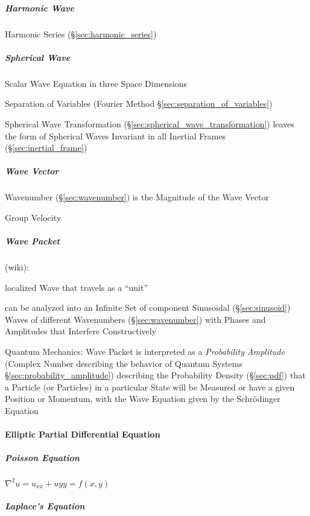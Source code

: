 \subparagraph{Harmonic Wave}\label{sec:harmonic_wave}\hfill

\fist Harmonic Series (\S\ref{sec:harmonic_series})



\subparagraph{Spherical Wave}\label{sec:spherical_wave}\hfill

Scalar Wave Equation in three Space Dimensions

Separation of Variables (Fourier Method \S\ref{sec:separation_of_variables})

Spherical Wave Transformation (\S\ref{sec:spherical_wave_transformation})
leaves the form of Spherical Waves Invariant in all Inertial Frames
(\S\ref{sec:inertial_frame})



\subparagraph{Wave Vector}\label{sec:wave_vector}\hfill

Wavenumber (\S\ref{sec:wavenumber}) is the Magnitude of the Wave Vector

Group Velocity



\subparagraph{Wave Packet}\label{sec:wave_packet}\hfill

(wiki):

localized Wave that travels as a ``unit''

can be analyzed into an Infinite Set of component Sinusoidal
(\S\ref{sec:sinusoid}) Waves of different Wavenumbers (\S\ref{sec:wavenumber})
with Phases and Amplitudes that Interfere Constructively

Quantum Mechanics: Wave Packet is interpreted as a \emph{Probability Amplitude}
(Complex Number describing the behavior of Quantum Systems
\S\ref{sec:probability_amplitude}) describing the Probability Density
(\S\ref{sec:pdf}) that a Particle (or Particles) in a particular State will be
Measured or have a given Position or Momentum, with the Wave Equation given by
the Schr\"odinger Equation



\paragraph{Elliptic Partial Differential Equation}
\label{sec:elliptic_partial_differential}\hfill

\subparagraph{Poisson Equation}\label{sec:poisson_equation}\hfill

$\nabla^2 u = u_{xx} + u{yy} = f(x,y)$



\subparagraph{Laplace's Equation}\label{sec:laplaces_equation}\hfill


